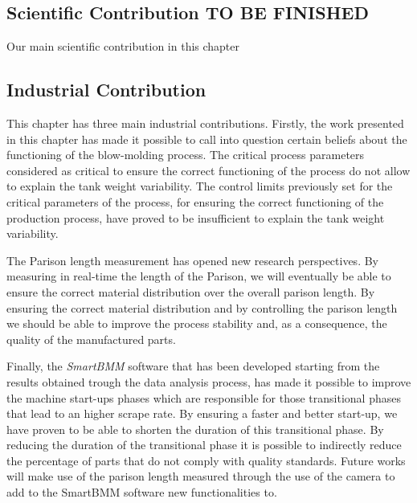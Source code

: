 \subsection{Scientific Contribution TO BE FINISHED}

Our main scientific contribution in this chapter



\subsection{Industrial Contribution}

This chapter has three main industrial contributions. Firstly, the work presented in this chapter has made it possible to call into question certain beliefs about the functioning of the blow-molding process. The critical process parameters considered as critical to ensure the correct functioning of the process do not allow to explain the tank weight variability. The control limits previously set for the critical parameters of the process, for ensuring the correct functioning of the production process, have proved to be insufficient to explain the tank weight variability. 

The Parison length measurement has opened new research perspectives. By measuring in real-time the length of the Parison, we will eventually be able to ensure the correct material distribution over the overall parison length. By ensuring the correct material distribution and by controlling the parison length we should be able to improve the process stability and, as a consequence, the quality of the manufactured parts. 

Finally, the \textit{SmartBMM} software that has been developed starting from the results obtained trough the data analysis process, has made it possible to improve the machine start-ups phases which are responsible for those transitional phases that lead to an higher scrape rate. By ensuring a faster and better start-up, we have proven to be able to shorten the duration of this transitional phase. By reducing the duration of the transitional phase it is possible to indirectly reduce the percentage of parts that do not comply with quality standards.   
Future works will make use of the parison length measured through the use of the camera to add to the SmartBMM software new functionalities to. 


